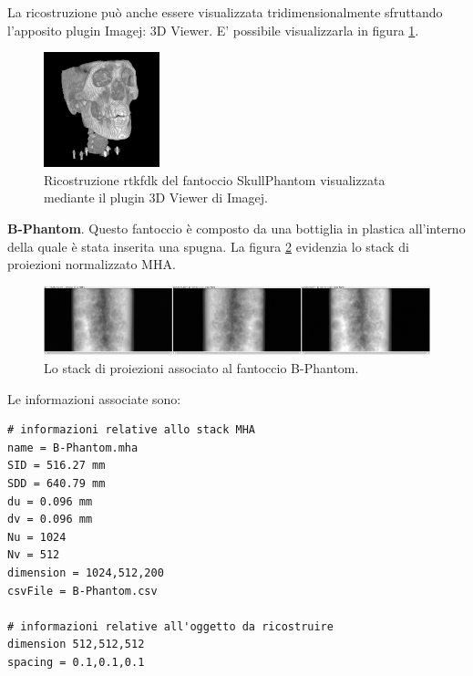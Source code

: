 \documentclass[a4paper,12pt, doubleside]{report}
\begin{document}
                La ricostruzione può anche essere visualizzata tridimensionalmente sfruttando l'apposito plugin Imagej: 3D Viewer. E' possibile visualizzarla in figura \ref{fig:skull-recon-3d}.
                
                \begin{figure}[h]
                    \centering                    \includegraphics[width=0.30\textwidth]{skull-recon-3d}
                    \caption{Ricostruzione rtkfdk del fantoccio SkullPhantom visualizzata mediante il plugin 3D Viewer di Imagej.}
                    \label{fig:skull-recon-3d}
                \end{figure}
            \bigskip
            \par
                \textbf{B-Phantom}. Questo fantoccio è composto da una bottiglia in plastica all'interno della quale è stata inserita una spugna. La figura \ref{fig:boccia_proj} evidenzia lo stack di proiezioni normalizzato MHA.
                
                \begin{figure}[h]
                    \centering
                    \includegraphics[width=1\textwidth]{boccia_proj}
                    \caption{Lo stack di proiezioni associato al fantoccio B-Phantom.}
                    \label{fig:boccia_proj}
                \end{figure}
                
                Le informazioni associate sono:
                \begin{lstlisting}
# informazioni relative allo stack MHA
name = B-Phantom.mha
SID = 516.27 mm
SDD = 640.79 mm
du = 0.096 mm
dv = 0.096 mm
Nu = 1024
Nv = 512
dimension = 1024,512,200
csvFile = B-Phantom.csv

# informazioni relative all'oggetto da ricostruire
dimension 512,512,512
spacing = 0.1,0.1,0.1
                \end{lstlisting}    
                
\end{document}
